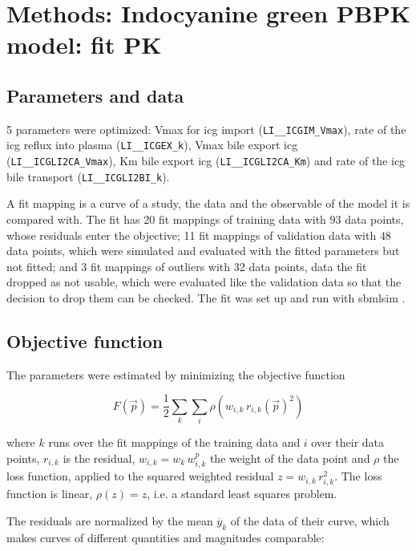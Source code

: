 \section{Methods: Indocyanine green PBPK model: fit PK}

\subsection{Parameters and data}

5 parameters were optimized: Vmax for icg import (\texttt{LI\_\_ICGIM\_Vmax}), rate of the icg reflux into plasma (\texttt{LI\_\_ICGEX\_k}), Vmax bile export icg (\texttt{LI\_\_ICGLI2CA\_Vmax}), Km bile export icg (\texttt{LI\_\_ICGLI2CA\_Km}) and rate of the icg bile transport (\texttt{LI\_\_ICGLI2BI\_k}).

A fit mapping is a curve of a study, the data and the observable of the model it is compared with. The fit has 20 fit mappings of training data with 93 data points, whose residuals enter the objective; 11 fit mappings of validation data with 48 data points, which were simulated and evaluated with the fitted parameters but not fitted; and 3 fit mappings of outliers with 32 data points, data the fit dropped as not usable, which were evaluated like the validation data so that the decision to drop them can be checked. The fit was set up and run with sbmlsim \cite{Koenig2026_sbmlsim}.

\subsection{Objective function}

The parameters were estimated by minimizing the objective function

\begin{equation}
F(\vec{p}) = \frac{1}{2} \sum_{k} \sum_{i} \rho\left(w_{i,k}\, r_{i,k}(\vec{p})^2\right)
\end{equation}

where $k$ runs over the fit mappings of the training data and $i$ over their data points, $r_{i,k}$ is the residual, $w_{i,k} = w_k\, w^{p}_{i,k}$ the weight of the data point and $\rho$ the loss function, applied to the squared weighted residual $z = w_{i,k}\, r_{i,k}^2$. The loss function is linear, $\rho(z) = z$, i.e. a standard least squares problem.

The residuals are normalized by the mean $\overline{y}_k$ of the data of their curve, which makes curves of different quantities and magnitudes comparable:

